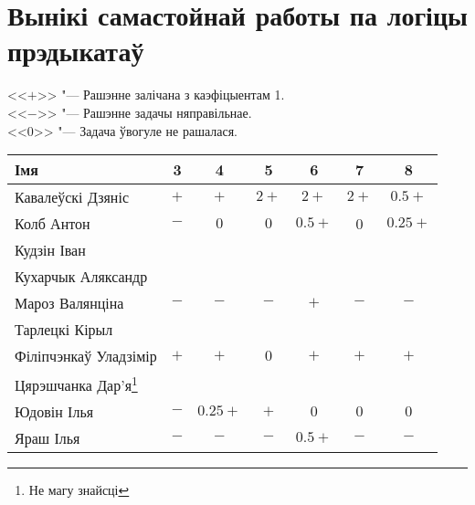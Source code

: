 


	\section{Вынікі самастойнай работы па логіцы прэдыкатаў}
    \noindent <<$+$>> "--- Рашэнне залічана з каэфіцыентам 1. \\
    <<$-$>> "--- Рашэнне задачы няправільнае. \\
    <<$0$>> "--- Задача ўвогуле не рашалася.
\begin{table}[H]
    \begin{minipage}{\textwidth}
    	\begin{tabular}{|l|c|c|c|c|c|c|}
		\hline
		Імя                                 &    3    &      4      &    5    &       6     &    7     &      8      \\ \hline
		Кавалеўскі Дзяніс         &  $+$  &    $+$    & $2+$ &    $2+$   & $2+$ &  $0.5+$  \\ \hline
		Колб Антон                   &  $-$  &    $0$    &  $0$  &  $0.5+$ &     0    & $0.25+$ \\ \hline
		Кудзін Іван                    &          &              &          &              &           &               \\ \hline
		Кухарчык Аляксандр    &          &              &           &             &           &                \\ \hline
		Мароз Валянціна          &  $-$  &    $-$     &  $-$   &    $+$   &   $-$  &      $-$     \\ \hline
		Тарлецкі Кірыл             &          &              &           &             &          &                 \\ \hline
		Філіпчэнкаў Уладзімір  &  $+$ &    $+$     &  $0$   &   $+$   &  $+$   &     $+$      \\ \hline
		Цярэшчанка Дар'я\footnote{Не магу знайсці}       &             &          & &   &    &  \\ \hline
		Юдовін Ілья                  &  $-$  & $0.25+$ &  $+$  &    $0$   &  $0$  &      $0$      \\ \hline
		Яраш Ілья                     &  $-$  &    $-$     &  $-$   & $0.5+$ &  $-$  &       $-$      \\ \hline
	   \end{tabular}
    \end{minipage}
\end{table}

